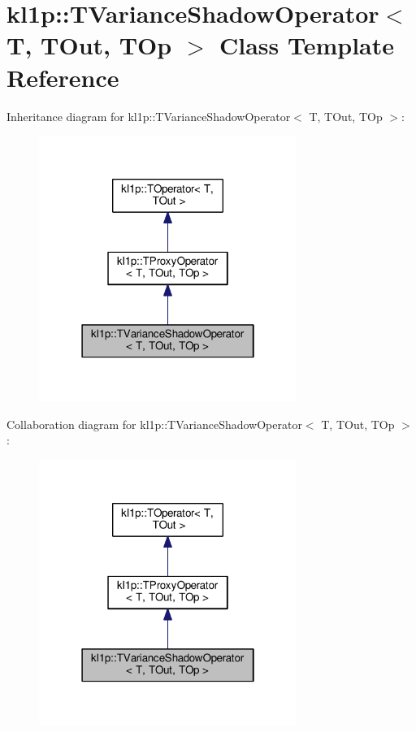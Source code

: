 \hypertarget{classkl1p_1_1TVarianceShadowOperator}{}\section{kl1p\+:\+:T\+Variance\+Shadow\+Operator$<$ T, T\+Out, T\+Op $>$ Class Template Reference}
\label{classkl1p_1_1TVarianceShadowOperator}


Inheritance diagram for kl1p\+:\+:T\+Variance\+Shadow\+Operator$<$ T, T\+Out, T\+Op $>$\+:
\nopagebreak
\begin{figure}[H]
\begin{center}
\leavevmode
\includegraphics[width=238pt]{classkl1p_1_1TVarianceShadowOperator__inherit__graph}
\end{center}
\end{figure}


Collaboration diagram for kl1p\+:\+:T\+Variance\+Shadow\+Operator$<$ T, T\+Out, T\+Op $>$\+:
\nopagebreak
\begin{figure}[H]
\begin{center}
\leavevmode
\includegraphics[width=238pt]{classkl1p_1_1TVarianceShadowOperator__coll__graph}
\end{center}
\end{figure}
